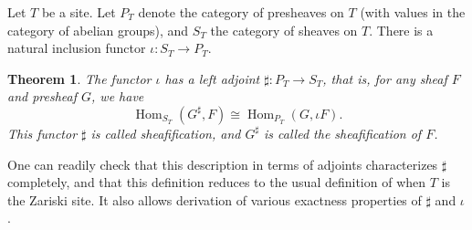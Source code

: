 \documentclass[12pt]{article}
\newtheorem{theorem}{Theorem}
\DeclareMathOperator{\Hom}{Hom}
\begin{document}
Let $T$ be a site.  Let $P_T$ denote the category of presheaves on $T$ (with values in the category of abelian groups), and $S_T$ the category of sheaves on $T$.  There is a natural inclusion functor $\iota\colon S_T \to P_T$. 

\begin{theorem}
The functor $\iota$ has a left adjoint $\sharp\colon P_T\to S_T$, that is, for any sheaf $F$ and presheaf $G$, we have
\[
\Hom_{S_T}(G^\sharp,F)\cong\Hom_{P_T}(G,\iota F).
\]
This functor $\sharp$ is called \emph{sheafification}, and $G^\sharp$ is called the \emph{sheafification of $F$}.
\end{theorem}

One can readily check that this description in terms of adjoints characterizes $\sharp$ completely, and that this definition reduces to the usual definition of  when $T$ is the Zariski site.  It also allows derivation of various exactness properties of $\sharp$ and $\iota$. 

\begin{thebibliography}{9}


\end{thebibliography}
\end{document}
